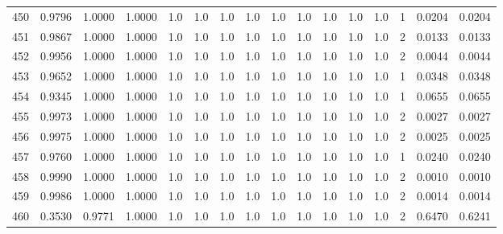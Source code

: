 \begin{tabular}{lrrrrrrrrrrrrrrr}
450 &      0.9796 &  1.0000 &  1.0000 &     1.0 &     1.0 &     1.0 &     1.0 &     1.0 &     1.0 &     1.0 &      1.0 &        1.0 &      1 &                    0.0204 &                     0.0204 \\
451 &      0.9867 &  1.0000 &  1.0000 &     1.0 &     1.0 &     1.0 &     1.0 &     1.0 &     1.0 &     1.0 &      1.0 &        1.0 &      2 &                    0.0133 &                     0.0133 \\
452 &      0.9956 &  1.0000 &  1.0000 &     1.0 &     1.0 &     1.0 &     1.0 &     1.0 &     1.0 &     1.0 &      1.0 &        1.0 &      2 &                    0.0044 &                     0.0044 \\
453 &      0.9652 &  1.0000 &  1.0000 &     1.0 &     1.0 &     1.0 &     1.0 &     1.0 &     1.0 &     1.0 &      1.0 &        1.0 &      1 &                    0.0348 &                     0.0348 \\
454 &      0.9345 &  1.0000 &  1.0000 &     1.0 &     1.0 &     1.0 &     1.0 &     1.0 &     1.0 &     1.0 &      1.0 &        1.0 &      1 &                    0.0655 &                     0.0655 \\
455 &      0.9973 &  1.0000 &  1.0000 &     1.0 &     1.0 &     1.0 &     1.0 &     1.0 &     1.0 &     1.0 &      1.0 &        1.0 &      2 &                    0.0027 &                     0.0027 \\
456 &      0.9975 &  1.0000 &  1.0000 &     1.0 &     1.0 &     1.0 &     1.0 &     1.0 &     1.0 &     1.0 &      1.0 &        1.0 &      2 &                    0.0025 &                     0.0025 \\
457 &      0.9760 &  1.0000 &  1.0000 &     1.0 &     1.0 &     1.0 &     1.0 &     1.0 &     1.0 &     1.0 &      1.0 &        1.0 &      1 &                    0.0240 &                     0.0240 \\
458 &      0.9990 &  1.0000 &  1.0000 &     1.0 &     1.0 &     1.0 &     1.0 &     1.0 &     1.0 &     1.0 &      1.0 &        1.0 &      2 &                    0.0010 &                     0.0010 \\
459 &      0.9986 &  1.0000 &  1.0000 &     1.0 &     1.0 &     1.0 &     1.0 &     1.0 &     1.0 &     1.0 &      1.0 &        1.0 &      2 &                    0.0014 &                     0.0014 \\
460 &      0.3530 &  0.9771 &  1.0000 &     1.0 &     1.0 &     1.0 &     1.0 &     1.0 &     1.0 &     1.0 &      1.0 &        1.0 &      2 &                    0.6470 &                     0.6241 \\

\end{tabular}
